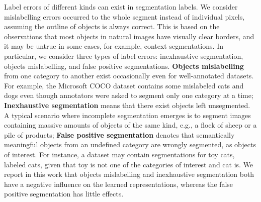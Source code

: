 

Label errors of different kinds can exist in segmentation labels.
We consider mislabelling errors occurred to the whole segment instead of individual pixels, assuming the outline of objects is always correct.
This is based on the observations that most objects in natural images have visually clear borders, and it may be untrue in some cases, for example, context segmentations\cite{mottaghi2014role}.
In particular, we consider three types of label errors: inexhaustive segmentation, objects mislabelling, and false positive segmentations.
\textbf{Objects mislabelling} from one category to another exist occasionally even for well-annotated datasets.
For example, the Microsoft COCO dataset \cite{lin2014microsoft} contains some mislabeled cats and dogs even though annotators were asked to segment only one category at a time;
\textbf{Inexhaustive segmentation} means that there exist objects left unsegmented.
A typical scenario where incomplete segmentation emerges is to segment images containing massive amounts of objects of the same kind, e.g., a flock of sheep or a pile of products;
\textbf{False positive segmentation} denotes that semantically meaningful objects from an undefined category are wrongly segmented, as objects of interest.
For instance, a dataset may contain segmentations for toy cats, labeled cats, given that toy is not one of the categories of interest and cat is.
We report in this work that objects mislabelling and inexhaustive segmentation both have a negative influence on the learned representations, whereas the false positive segmentation has little effects.




